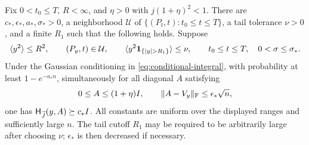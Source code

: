 \begin{lemma}
\label{lem:conditional-field-stability}
Fix $0<t_0\le T$, $R<\infty$, and $\eta>0$ with
$j(1+\eta)^2<1$.  There are $c_*,\epsilon_*,a_*,\sigma_*>0$,
a neighborhood $\mathcal U$ of
$\{(P_t,t):t_0\le t\le T\}$, a tail tolerance $\nu>0$, and a finite
$R_1$ such that the following holds.  Suppose
\[
 \av{y^2}\le R^2,\qquad (P_y,t)\in\mathcal U,\qquad
 \av{y^2\one_{\{|y|>R_1\}}}\le\nu,
 \qquad t_0\le t\le T,\quad0<\sigma\le\sigma_*.
\]
Under the Gaussian conditioning in
\eqref{eq:conditional-integral}, with probability at least
$1-e^{-a_*n}$, simultaneously for all diagonal $A$ satisfying
\[
 0\le A\le(1+\eta)I,\qquad
 \lVert A-V_y\rVert_{\mathrm F}\le\epsilon_*\sqrt n,
\]
one has $\mathsf H_{\widetilde J}(y,A)\succeq c_*I$.
All constants are uniform over the displayed ranges and sufficiently
large $n$.  The tail cutoff $R_1$ may be required to be arbitrarily
large after choosing $\nu$; $\epsilon_*$ is then decreased if
necessary.
\end{lemma}

